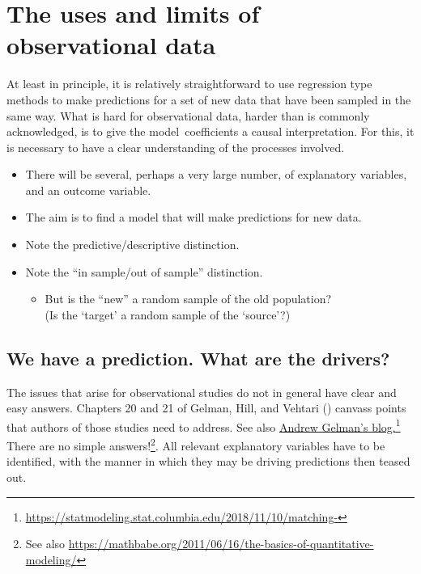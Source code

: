 \documentclass[
  10ptls,
  b5paper]{book}
\providecommand{\tightlist}{%
  \setlength{\itemsep}{0pt}\setlength{\parskip}{0pt}}
\begin{document}
\chapter{The uses and limits of observational data}\label{ch:obs}

At least in principle, it is relatively straightforward to use regression type methods to make predictions for a set of new data that have been sampled in the same way. What is hard for observational data, harder than is commonly acknowledged, is to give the model~coefficients a causal interpretation. For this, it is necessary to have a clear understanding of the processes involved.

\begin{itemize}
\tightlist
\item
  There will be several, perhaps a very large number, of explanatory variables, and an outcome variable.
\item
  The aim is to find a model that will make predictions for new data.
\item
  Note the predictive/descriptive distinction.\\
\item
  Note the ``in sample/out of sample'' distinction.

  \begin{itemize}
  \tightlist
  \item
    But is the ``new'' a random sample of the old population?\\
    (Is the `target' a random sample of the `source'?)
  \end{itemize}
\end{itemize}

\section{We have a prediction. What are the drivers?}\label{we-have-a-prediction.-what-are-the-drivers}

The issues that arise for observational studies do not in general have clear and easy answers. Chapters 20 and 21 of Gelman, Hill, and Vehtari () canvass points that authors of those studies need to address. See also \href{https://statmodeling.stat.columbia.edu/2018/11/10/matching-discarding-non-matches-deal-lack-complete-overlap-regression-adjust-imbalance-treatment-control-groups/}{Andrew Gelman's blog.}\footnote{\url{https://statmodeling.stat.columbia.edu/2018/11/10/matching-}} There are no simple answers!\footnote{See also \url{https://mathbabe.org/2011/06/16/the-basics-of-quantitative-modeling/}}. All relevant explanatory variables have to be identified, with the manner in which they may be driving predictions then teased out.
\end{document}
